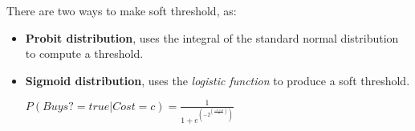 \begin{example}
    There are two ways to make soft threshold, as:
    \begin{itemize}
        \renewcommand{\labelitemi}{-}
        \item \textbf{Probit distribution}, uses the integral of the standard normal distribution to compute a threshold.
        \item \textbf{Sigmoid distribution}, uses the \textit{logistic function} to produce a soft threshold.
        \begin{center}
            $P(Buys? = true | Cost = c) = \frac{1}{1+e^{(-2^{(\frac{-c+\mu}{\sigma})})}}$
        \end{center}
    \end{itemize}
\end{example}